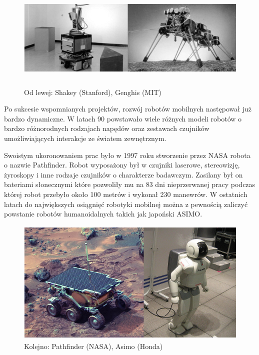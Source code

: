 \begin{figure}[h!]
 \centering
 \includegraphics[height=50mm]{../images/ch01/shakey_and_genghis.png}
 \caption{Od lewej: Shakey (Stanford), Genghis (MIT) }
 \label{fig:RobotsHistory_Shakey_Genghis}
\end{figure}

Po sukcesie wspomnianych projektów, rozwój robotów mobilnych następował już
bardzo dynamiczne. W latach 90 powstawało wiele różnych modeli robotów o bardzo
różnorodnych rodzajach napędów oraz zestawach czujników umożliwiających
interakcje ze światem zewnętrznym.

Swoistym ukoronowaniem prac było w 1997 roku stworzenie przez NASA robota o
nazwie Pathfinder. Robot wyposażony był w czujniki laserowe, stereowizję,
żyroskopy i inne rodzaje czujników o charakterze badawczym. Zasilany był on
bateriami słonecznymi które pozwoliły mu na 83 dni nieprzerwanej pracy podczas
której robot przebyło około 100 metrów i wykonał 230 manewrów. W ostatnich
latach do największych osiągnięć robotyki mobilnej można z pewnością zaliczyć
powstanie robotów humanoidalnych takich jak japoński ASIMO. 

\begin{figure}[h!]
 \centering
 \includegraphics[height=60mm]{../images/ch01/pathfinder_and_asimo.png}
 \caption{Kolejno: Pathfinder (NASA), Asimo (Honda)}
 \label{fig:RobotsHistory_Pathfinder_Asimo}
\end{figure}

